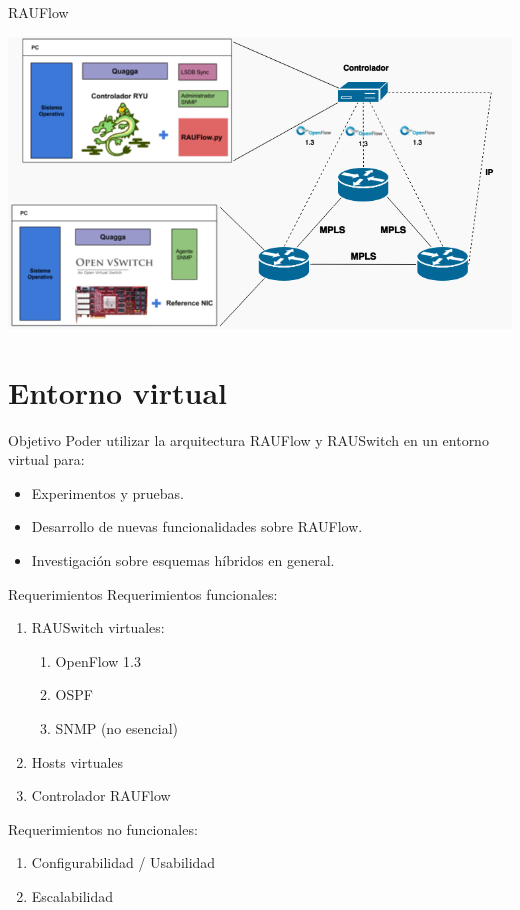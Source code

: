 \documentclass[xcolor=svgnames]{beamer}
\begin{document}
\begin{frame}{RAUFlow}
	\begin{center}
		\includegraphics[scale=0.6]{componentes_rauflow}
	\end{center}
\end{frame}

\section{Entorno virtual}

\begin{frame}{}
	\tableofcontents[currentsection]
\end{frame}

\begin{frame}{Objetivo}
	Poder utilizar la arquitectura RAUFlow y RAUSwitch en un entorno virtual para:
	\begin{itemize}
		\item Experimentos y pruebas.
		\item Desarrollo de nuevas funcionalidades sobre RAUFlow.
		\item Investigación sobre esquemas híbridos en general.
	\end{itemize}
\end{frame}

\begin{frame}{Requerimientos}
	Requerimientos funcionales:
	\begin{enumerate}
		\item RAUSwitch virtuales:
		\begin{enumerate}
			\item OpenFlow 1.3
			\item OSPF
			\item SNMP (no esencial)
		\end{enumerate}
		\item Hosts virtuales
		\item Controlador RAUFlow
	\end{enumerate}
	\pause
	Requerimientos no funcionales:
	\begin{enumerate}
		\item Configurabilidad / Usabilidad
		\item Escalabilidad
	\end{enumerate}
\end{frame}
\end{document}
